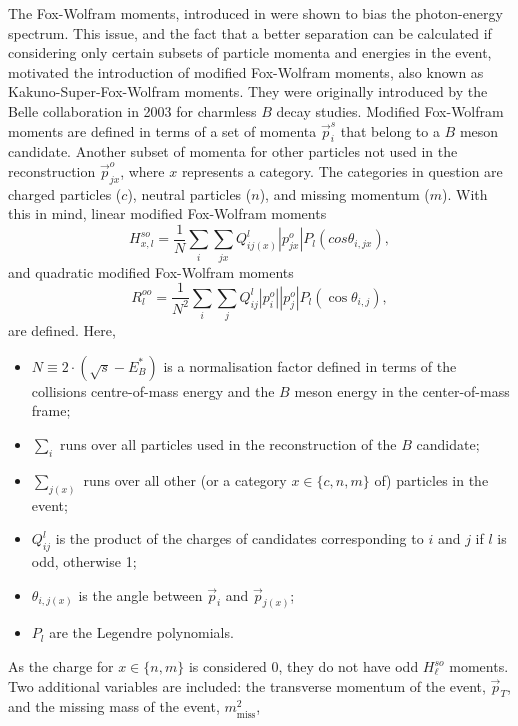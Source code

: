The Fox-Wolfram moments, introduced in  were shown to bias the photon-energy spectrum.
This issue, and the fact that a better separation can be calculated if considering only certain subsets of particle momenta and energies in the event,
motivated the introduction of modified Fox-Wolfram moments, also known as Kakuno-Super-Fox-Wolfram moments.
They were originally introduced by the Belle collaboration in 2003 \cite{Belle:2003fgr} for charmless $B$ decay studies.
Modified Fox-Wolfram moments are defined in terms of a set of momenta $\vec{p}^{s}_i$ that belong to a $B$ meson candidate.
Another subset of momenta for other particles not used in the reconstruction $\vec{p}^{o}_{jx}$, where $x$ represents a category.
The categories in question are charged particles ($c$), neutral particles ($n$), and missing momentum ($m$).
With this in mind, linear modified Fox-Wolfram moments 
\begin{equation}
    H_{x,l}^{so} = \frac{1}{N} \sum_i \sum_{jx} Q^{l}_{ij(x)}|p^o_{jx}|P_l(cos\theta_{i,jx}),
\end{equation}
and quadratic modified Fox-Wolfram moments
\begin{equation}
    R_{l}^{oo} = \frac{1}{N^2} \sum_i \sum_j Q^{l}_{ij} |p^o_i||p^o_j|P_l(\cos\theta_{i,j}),
\end{equation}
are defined.
Here, 
\begin{itemize}
\item $N\equiv 2\cdot(\sqrt{s}-E^{*}_B)$ is a normalisation factor defined in terms of the collisions centre-of-mass energy and the $B$ meson energy in the center-of-mass frame;
\item $\sum_i$ runs over all particles used in the reconstruction of the $B$ candidate;
\item $\sum_{j(x)}$ runs over all other (or a category $x\in\{c,n,m\}$ of) particles in the event;
\item $Q^{l}_{ij}$ is the product of the charges of candidates corresponding to $i$ and $j$ if $l$ is odd, otherwise 1;
\item $\theta_{i,j(x)}$ is the angle between $\vec{p}_i$ and $\vec{p}_{j(x)}$;
\item $P_l$ are the Legendre polynomials.
\end{itemize}
As the charge for $x\in\{n,m\}$ is considered 0, they do not have odd $H^{so}_{\ell}$ moments.
Two additional variables are included: the transverse momentum of the event, $\vec{p}_{T}$, and the missing mass of the event, $m_{\mathrm{miss}}^2$,
